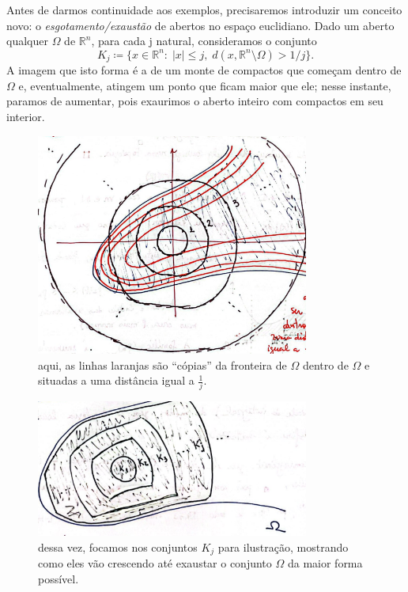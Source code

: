 \documentclass[../distribution_theory_notes.tex]{subfiles}
\begin{document}
  Antes de darmos continuidade aos exemplos, precisaremos introduzir um conceito novo: o \textit{esgotamento/exaustão} de abertos no espaço euclidiano. Dado um aberto qualquer \(\Omega \) de \(\mathbb{R}^{n}\), para cada j natural, consideramos o conjunto 
    \[
      K_{j}\coloneqq \{x\in \mathbb{R}^{n}:\; |x|\leq j,\; d(x, \mathbb{R}^{n}\setminus{\Omega })>1/j\}.
    \] 
    A imagem que isto forma é a de um monte de compactos que começam dentro de \(\Omega \) e, eventualmente, atingem um ponto que ficam maior que ele; nesse instante, paramos de aumentar, pois exaurimos o aberto inteiro com compactos em seu interior. 
   \begin{figure}[H]
   \begin{center}
   \includegraphics[height=0.8\textheight, width=0.8\textwidth, keepaspectratio]{./Images/big_exhaustion_03.png}
   \end{center}
   \caption{aqui, as linhas laranjas são ``cópias'' da fronteira de \(\Omega \) dentro de \(\Omega \) e situadas a uma distância igual a \(\frac{1}{j}\).}
   \end{figure}
  \begin{figure}[H]
  \begin{center}
  \includegraphics[height=0.8\textheight, width=0.8\textwidth, keepaspectratio]{./Images/small_exhaustion_03.png}
  \end{center}
  \caption{dessa vez, focamos nos conjuntos \(K_{j}\) para ilustração, mostrando como eles vão crescendo até exaustar o conjunto \(\Omega \) da maior forma possível.}
  \end{figure}
\end{document}
